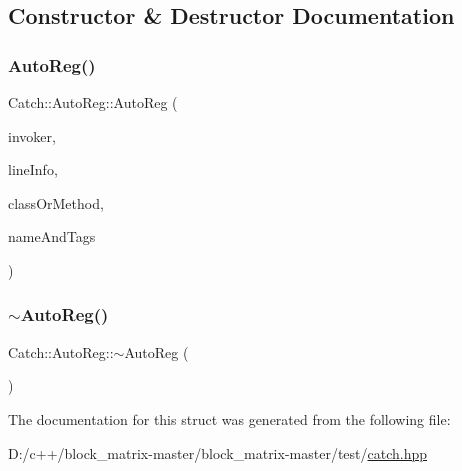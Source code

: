 \subsection{Constructor \& Destructor Documentation}
\mbox{\label{struct_catch_1_1_auto_reg_a7eba02fb9d80b9896bf5a6517369af28}} 
\subsubsection{\texorpdfstring{Auto\+Reg()}{AutoReg()}}
{\footnotesize\ttfamily Catch\+::\+Auto\+Reg\+::\+Auto\+Reg (\begin{DoxyParamCaption}\item[{\mbox{\hyperlink{struct_catch_1_1_i_test_invoker}{I\+Test\+Invoker}} $\ast$}]{invoker,  }\item[{\mbox{\hyperlink{struct_catch_1_1_source_line_info}{Source\+Line\+Info}} const \&}]{line\+Info,  }\item[{\mbox{\hyperlink{class_catch_1_1_string_ref}{String\+Ref}} const \&}]{class\+Or\+Method,  }\item[{\mbox{\hyperlink{struct_catch_1_1_name_and_tags}{Name\+And\+Tags}} const \&}]{name\+And\+Tags }\end{DoxyParamCaption})\hspace{0.3cm}{\ttfamily [noexcept]}}

\mbox{\label{struct_catch_1_1_auto_reg_a3cdb53f1e5ff115310f3372bebe198f1}} 
\subsubsection{\texorpdfstring{$\sim$\+Auto\+Reg()}{~AutoReg()}}
{\footnotesize\ttfamily Catch\+::\+Auto\+Reg\+::$\sim$\+Auto\+Reg (\begin{DoxyParamCaption}{ }\end{DoxyParamCaption})}



The documentation for this struct was generated from the following file\+:\begin{DoxyCompactItemize}
\item 
D\+:/c++/block\+\_\+matrix-\/master/block\+\_\+matrix-\/master/test/\mbox{\hyperlink{catch_8hpp}{catch.\+hpp}}\end{DoxyCompactItemize}

